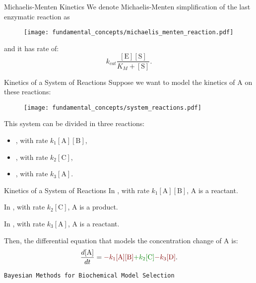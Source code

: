 \documentclass{beamer}
\begin{document}
\begin{frame}{Michaelis-Menten Kinetics}
We denote Michaelis-Menten simplification of the last enzymatic reaction
as
\begin{figure}
\texttt{[image: fundamental\_concepts/michaelis\_menten\_reaction.pdf]}
\end{figure}
\pause
and it has rate of:
\begin{equation*}
    k_{cat} \frac{[\text{E}][\text{S}]}{K_M + [\text{S}]}.
\end{equation*}
\end{frame}


\begin{frame}{Kinetics of a System of Reactions}
Suppose we want to model the kinetics of A on these reactions:
\begin{figure}
    \texttt{[image: fundamental\_concepts/system\_reactions.pdf]}
\end{figure}
This system can be divided in three reactions:
\begin{itemize}
    \pause
    \item{, with rate $k_1[\text{A}][\text{B}]$,}
    \pause
    \item{, with rate $k_2[\text{C}]$,}
    \pause
    \item{, with rate $k_3[\text{A}]$.}
\end{itemize}
\end{frame}

\begin{frame}{Kinetics of a System of Reactions}
In , with rate 
{\color{red!50!black}$k_1[\text{A}][\text{B}]$}, A is a reactant.
\pause

In , with rate 
{\color{green!50!black}$k_2[\text{C}]$}, A is a product.
\pause

In , with rate 
{\color{red!50!black}$k_3[\text{A}]$}, A is a reactant.
\pause

Then, the differential equation that models the concentration change of 
A is:
\pause
\begin{equation*}
    \frac{d[\text{A}]}{dt} = 
        {\color{red!50!black}- k_1[\text{A}][\text{B}]}
        {\color{green!50!black}+ k_2[\text{C}]}
        {\color{red!50!black}- k_3[\text{D}]}.
\end{equation*}
\end{frame}


\begin{frame}{}
\begin{center}
\texttt{Bayesian Methods for Biochemical Model Selection}
\end{center}
\end{frame}
\end{document}

